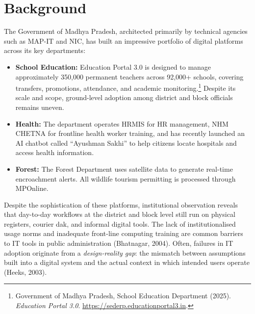 \documentclass[11pt,a4paper]{article}
\begin{document}
\newpage



\section{Background}

\vspace{0.2cm}
The Government of Madhya Pradesh, architected primarily by technical agencies such as MAP-IT and NIC, has built an impressive portfolio of digital platforms across its key departments:

\begin{itemize}[leftmargin=1.4em]
  \item \textbf{School Education:} Education Portal 3.0 is designed to manage
    approximately 350,000 permanent teachers across 92,000+ schools, covering
    transfers, promotions, attendance, and academic monitoring.\footnote{Government
    of Madhya Pradesh, School Education Department (2025). \textit{Education Portal
    3.0}. \url{https://sederp.educationportal3.in}.}
    Despite its scale and scope, ground-level adoption among district and block
    officials remains uneven.

  \item \textbf{Health:} The department operates HRMIS for HR management, NHM CHETNA
    for frontline health worker training, and has recently launched an AI chatbot called
    ``Ayushman Sakhi'' to help citizens locate hospitals and access health
    information.

  \item \textbf{Forest:} The Forest Department uses satellite data
    to generate real-time encroachment alerts. All wildlife tourism permitting is
    processed through MPOnline.
\end{itemize}

Despite the sophistication of these platforms, institutional observation
reveals that day-to-day workflows at the district and block level still run
on physical registers, courier dak, and informal digital tools. The lack of 
institutionalised usage norms and inadequate front-line computing training are common 
barriers to IT tools in public administration (Bhatnagar, 2004). Often, failures in IT 
adoption originate from a \textit{design-reality gap}: the mismatch between assumptions 
built into a digital system and the actual context in which intended users operate (Heeks, 2003). 
\end{document}
